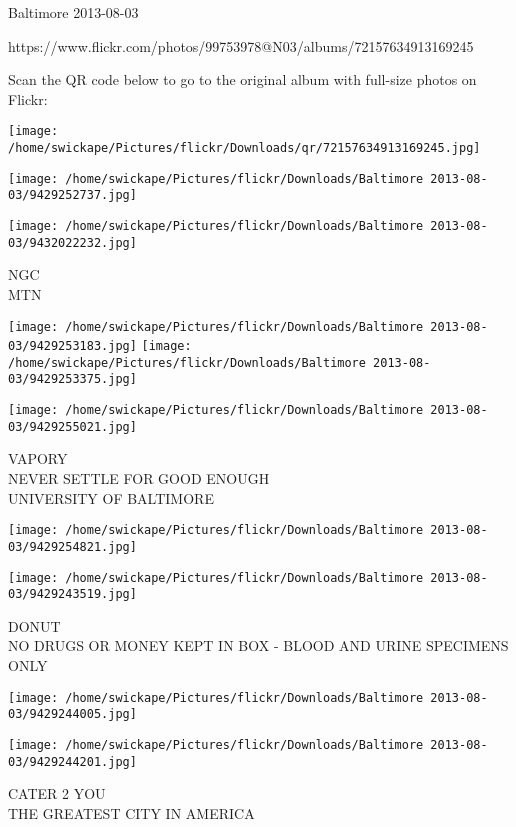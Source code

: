 \documentclass[10pt,letterpaper]{article}
\begin{document}
Baltimore 2013-08-03

https://www.flickr.com/photos/99753978@N03/albums/72157634913169245

Scan the QR code below to go to the original album with full-size photos on Flickr:

\texttt{[image: /home/swickape/Pictures/flickr/Downloads/qr/72157634913169245.jpg]}
\pagebreak

\texttt{[image: /home/swickape/Pictures/flickr/Downloads/Baltimore 2013-08-03/9429252737.jpg]}

\vspace{0.25in}
\texttt{[image: /home/swickape/Pictures/flickr/Downloads/Baltimore 2013-08-03/9432022232.jpg]}

NGC\\
MTN
\pagebreak

\texttt{[image: /home/swickape/Pictures/flickr/Downloads/Baltimore 2013-08-03/9429253183.jpg]}
\texttt{[image: /home/swickape/Pictures/flickr/Downloads/Baltimore 2013-08-03/9429253375.jpg]}

\vspace{0.25in}
\texttt{[image: /home/swickape/Pictures/flickr/Downloads/Baltimore 2013-08-03/9429255021.jpg]}

VAPORY\\
NEVER SETTLE FOR GOOD ENOUGH\\
UNIVERSITY OF BALTIMORE
\pagebreak

\texttt{[image: /home/swickape/Pictures/flickr/Downloads/Baltimore 2013-08-03/9429254821.jpg]}

\vspace{0.25in}
\texttt{[image: /home/swickape/Pictures/flickr/Downloads/Baltimore 2013-08-03/9429243519.jpg]}

DONUT\\
NO DRUGS OR MONEY KEPT IN BOX {-} BLOOD AND URINE SPECIMENS ONLY
\pagebreak

\texttt{[image: /home/swickape/Pictures/flickr/Downloads/Baltimore 2013-08-03/9429244005.jpg]}

\vspace{0.25in}
\texttt{[image: /home/swickape/Pictures/flickr/Downloads/Baltimore 2013-08-03/9429244201.jpg]}

CATER 2 YOU\\
THE GREATEST CITY IN AMERICA
\pagebreak
\end{document}

